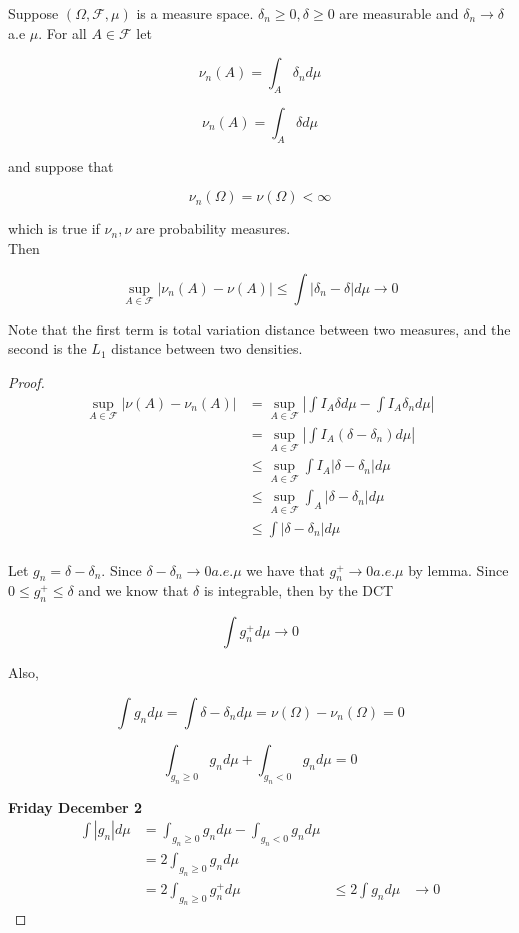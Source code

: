 \documentclass[11pt,fleqn]{book} %
\begin{document}
\begin{theorem}
	Suppose $(\Omega, \mathcal{F}, \mu)$ is a measure space. $\delta_n \geq0, \delta \geq 0$ are measurable and $\delta_n \rightarrow \delta$ a.e $\mu$. For all $A \in \mathcal{F}$ let

			$$\nu_n(A) = \int_A \delta_n d\mu $$

			$$ \nu_n(A) = \int_A \delta d\mu $$

	and suppose that 

			$$\nu_n(\Omega) = \nu(\Omega) < \infty $$

	which is true if $\nu_n, \nu$ are probability measures. \\

	Then 

			$$\sup_{A \in \mathcal{F}} |\nu_n(A) - \nu(A)| \leq \int |\delta_n - \delta| d\mu \rightarrow 0 $$

	Note that the first term is total variation distance between two measures, and the second is the $L_1$ distance between two densities. \\
\end{theorem}

\begin{proof}
	
	\begin{align*}
			\sup_{A \in \mathcal{F}} |\nu(A) - \nu_n(A)| &= \sup_{A \in \mathcal{F}} |\int I_A \delta d\mu - \int I_A \delta_n d\mu|\\
				&= \sup_{A \in \mathcal{F}} |\int I_A (\delta - \delta_n) d\mu|\\
				&\leq \sup_{A \in \mathcal{F}} \int I_A |\delta - \delta_n| d\mu\\
				&\leq \sup_{A \in \mathcal{F}} \int_A |\delta - \delta_n| d\mu\\
				&\leq \int |\delta - \delta_n| d\mu\\
	\end{align*}

	Let $g_n = \delta - \delta_n$. Since $\delta - \delta_n \rightarrow0 a.e. \mu$ we have that $g_n^+ \rightarrow 0 a.e. \mu$ by lemma. Since $0 \leq g_n^+ \leq \delta$ and we know that $\delta$ is integrable, then by the DCT

			$$ \int g_n^+ d\mu \rightarrow 0 $$

	Also, 

			$$\int g_n d \mu = \int \delta - \delta_n d\mu = \nu(\Omega) - \nu_n(\Omega) = 0 $$

			$$\int_{g_n \geq 0} g_n d\mu + \int _{g_n < 0} g_n d\mu = 0 $$ 

\textbf{Friday December 2}\\

		\begin{align*}
			\int |g_n| d\mu &= \int_{g_n \geq 0} g_n d\mu - \int _{g_n < 0} g_n d\mu\\ 
				&= 2\int_{g_n \geq 0} g_n d\mu \\
				&=2 \int_{g_n \geq 0} g_n^+ d\mu
				&\leq 2 \int g_n d\mu
				&\rightarrow 0   
		\end{align*} 

\end{proof}
\end{document}
